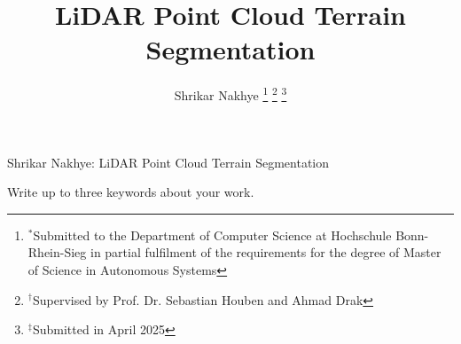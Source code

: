 \documentclass[lettersize,journal]{IEEEtran}
\begin{document}
\title{LiDAR Point Cloud Terrain Segmentation}

\author{Shrikar Nakhye
\thanks{$^*$Submitted to the Department of Computer Science at Hochschule Bonn-Rhein-Sieg in partial fulfilment of the requirements for the degree of Master of Science in Autonomous Systems}
\thanks{$^{\dagger}$Supervised by Prof. Dr. Sebastian Houben and Ahmad Drak}
\thanks{$^{\ddagger}$Submitted in April 2025}} %

%
{Shrikar Nakhye: LiDAR Point Cloud Terrain Segmentation}

\maketitle



\begin{IEEEkeywords}
Write up to three keywords about your work.
\end{IEEEkeywords}














\end{document}
